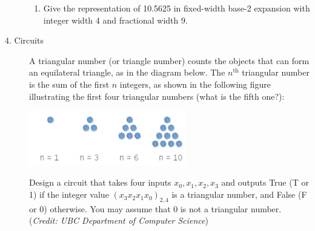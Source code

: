 \begin{description}
\begin{enumerate}
\item Give the representation of 10.5625 in fixed-width base-2 expansion with
integer width 4 and fractional width 9.

\ifsolution
{}
\else{}
\fi
\end{enumerate}


\item[4. Circuits]   
A triangular number (or triangle number) counts the objects that can form an equilateral
triangle, as in the diagram below. The $n^{\text{th}}$ triangular number is the sum of the first $n$
 integers,
as shown in the following figure illustrating the first four triangular numbers (what is the
fifth one?):
\begin{center}
\includegraphics[width=2.7in]{../../resources/images/triangle.png}
\end{center}
Design a circuit that takes four inputs $x_0, x_1, x_2, x_3$ and outputs
True (T or 1) if the integer value 
$(x_3x_2x_1x_0)_{2,4} $ is a triangular number, and False (F or 0) otherwise. You may assume that 0 is
not a triangular number. ({\it Credit: UBC Department of Computer Science})


\end{description}
